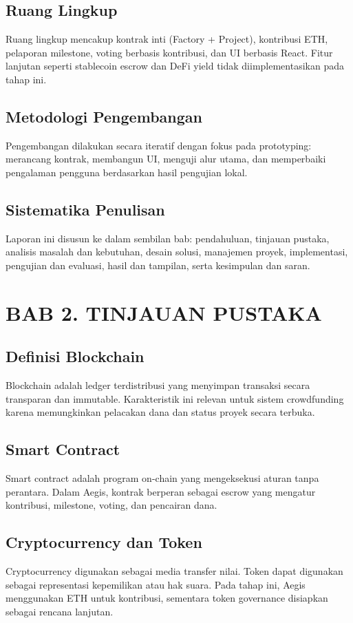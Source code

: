 \documentclass[12pt]{article}
\begin{document}
\subsection{Ruang Lingkup}
Ruang lingkup mencakup kontrak inti (Factory + Project), kontribusi ETH, pelaporan milestone, voting berbasis kontribusi, dan UI berbasis React. Fitur lanjutan seperti stablecoin escrow dan DeFi yield tidak diimplementasikan pada tahap ini.

\subsection{Metodologi Pengembangan}
Pengembangan dilakukan secara iteratif dengan fokus pada prototyping: merancang kontrak, membangun UI, menguji alur utama, dan memperbaiki pengalaman pengguna berdasarkan hasil pengujian lokal.

\subsection{Sistematika Penulisan}
Laporan ini disusun ke dalam sembilan bab: pendahuluan, tinjauan pustaka, analisis masalah dan kebutuhan, desain solusi, manajemen proyek, implementasi, pengujian dan evaluasi, hasil dan tampilan, serta kesimpulan dan saran.

\section{BAB 2. TINJAUAN PUSTAKA}
\subsection{Definisi Blockchain}
Blockchain adalah ledger terdistribusi yang menyimpan transaksi secara transparan dan immutable. Karakteristik ini relevan untuk sistem crowdfunding karena memungkinkan pelacakan dana dan status proyek secara terbuka.

\subsection{Smart Contract}
Smart contract adalah program on-chain yang mengeksekusi aturan tanpa perantara. Dalam Aegis, kontrak berperan sebagai escrow yang mengatur kontribusi, milestone, voting, dan pencairan dana.

\subsection{Cryptocurrency dan Token}
Cryptocurrency digunakan sebagai media transfer nilai. Token dapat digunakan sebagai representasi kepemilikan atau hak suara. Pada tahap ini, Aegis menggunakan ETH untuk kontribusi, sementara token governance disiapkan sebagai rencana lanjutan.
\end{document}
